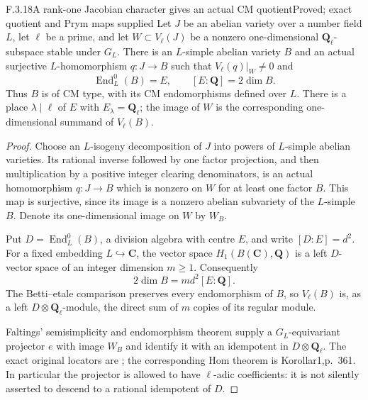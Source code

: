 \begin{result}{F.3.18}{A rank-one Jacobian character gives an actual CM quotient}{Proved; exact quotient and Prym maps supplied}
Let $J$ be an abelian variety over a number field $L$, let $\ell$ be a prime,
and let $W\subset V_\ell(J)$ be a nonzero one-dimensional
$\mathbf Q_\ell$-subspace stable under $G_L$.
There is an $L$-simple abelian variety $B$ and an actual surjective
$L$-homomorphism $q:J\to B$ such that $V_\ell(q)|_W\ne0$ and
\[
 \operatorname{End}^0_L(B)=E,\qquad [E:\mathbf Q]=2\dim B.
\]
Thus $B$ is of CM type, with its CM endomorphisms defined over $L$.
There is a place $\lambda\mid\ell$ of $E$ with $E_\lambda=\mathbf Q_\ell$;
the image of $W$ is the corresponding one-dimensional summand of
$V_\ell(B)$.
\end{result}
\begin{proof}
Choose an $L$-isogeny decomposition of $J$ into powers of $L$-simple
abelian varieties. Its rational inverse followed by one factor projection,
and then multiplication by a positive integer clearing denominators,
is an actual homomorphism $q:J\to B$ which is nonzero on $W$ for at least
one factor $B$. This map is surjective, since its image is a nonzero
abelian subvariety of the $L$-simple $B$. Denote its one-dimensional
image on $W$ by $W_B$.

Put $D=\operatorname{End}^0_L(B)$, a division algebra with centre $E$,
and write $[D:E]=d^2$. For a fixed embedding $L\hookrightarrow\mathbf C$,
the vector space $H_1(B(\mathbf C),\mathbf Q)$ is a left $D$-vector space
of an integer dimension $m\ge1$. Consequently
\[
 2\dim B=m d^2[E:\mathbf Q].
\]
The Betti--etale comparison preserves every endomorphism of $B$, so
$V_\ell(B)$ is, as a left $D\otimes\mathbf Q_\ell$-module, the direct
sum of $m$ copies of its regular module.

Faltings' semisimplicity and endomorphism theorem supply a $G_L$-equivariant
projector $e$ with image $W_B$ and identify it with an idempotent in
$D\otimes\mathbf Q_\ell$.
The exact original locators are \cite[\S5, S\"atze3--4,p.~360]{GenFaltings1983};
the corresponding Hom theorem is Korollar1,p.~361. In particular the
projector is allowed to have $\ell$-adic coefficients: it is not silently
asserted to descend to a rational idempotent of $D$.


\end{proof}
